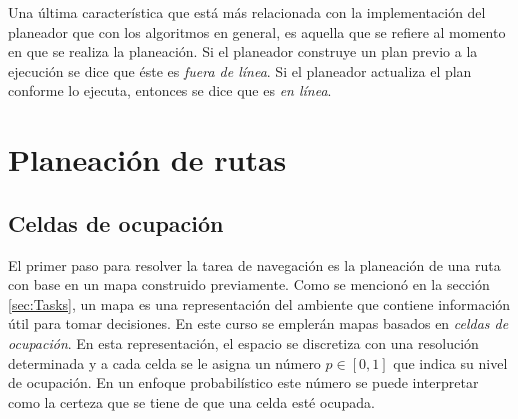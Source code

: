 Una última característica que está más relacionada con la implementación del planeador que con los algoritmos en general, es aquella que se refiere al momento en que se realiza la planeación. Si el planeador construye un plan previo a la ejecución se dice que éste es \textit{fuera de línea}. Si el planeador actualiza el plan conforme lo ejecuta, entonces se dice que es \textit{en línea}.

\section{Planeación de rutas}
\label{sec:PathPlanning}
\subsection{Celdas de ocupación}

El primer paso para resolver la tarea de navegación es la planeación de una ruta con base en un mapa construido previamente. Como se mencionó en la sección \ref{sec:Tasks}, un mapa es una representación del ambiente que contiene información útil para tomar decisiones. En este curso se emplerán mapas basados en \textit{celdas de ocupación}. En esta representación, el espacio se discretiza con una resolución determinada y a cada celda se le asigna un número $p\in[0,1]$ que indica su nivel de ocupación. En un enfoque probabilístico este número se puede interpretar como la certeza que se tiene de que una celda esté ocupada. 

